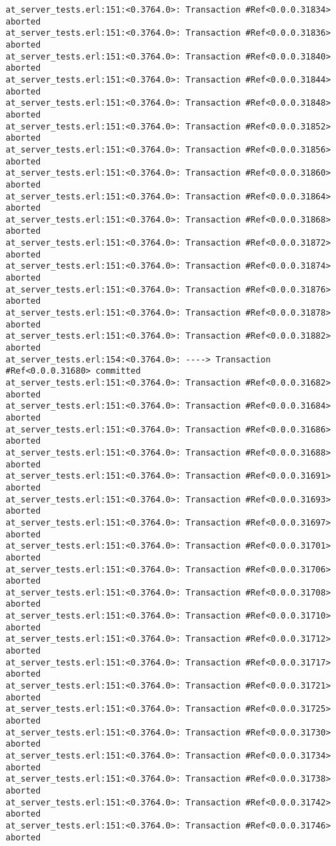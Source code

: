 \documentclass[
paper=a4,
oneside,
fontsize=11pt,
numbers=noenddot,
headinclude=false, %
footinclude=false, %
fleqn,             %
DIV=8
]{scrartcl}
\begin{document}
\begin{lstlisting}[caption=Session output: {\tt
    commit\_t\_competing\_test()} (debug enabled),
  label=lst:testoutcommit, basicstyle=\ttfamily\scriptsize]
at_server_tests.erl:151:<0.3764.0>: Transaction #Ref<0.0.0.31834> aborted
at_server_tests.erl:151:<0.3764.0>: Transaction #Ref<0.0.0.31836> aborted
at_server_tests.erl:151:<0.3764.0>: Transaction #Ref<0.0.0.31840> aborted
at_server_tests.erl:151:<0.3764.0>: Transaction #Ref<0.0.0.31844> aborted
at_server_tests.erl:151:<0.3764.0>: Transaction #Ref<0.0.0.31848> aborted
at_server_tests.erl:151:<0.3764.0>: Transaction #Ref<0.0.0.31852> aborted
at_server_tests.erl:151:<0.3764.0>: Transaction #Ref<0.0.0.31856> aborted
at_server_tests.erl:151:<0.3764.0>: Transaction #Ref<0.0.0.31860> aborted
at_server_tests.erl:151:<0.3764.0>: Transaction #Ref<0.0.0.31864> aborted
at_server_tests.erl:151:<0.3764.0>: Transaction #Ref<0.0.0.31868> aborted
at_server_tests.erl:151:<0.3764.0>: Transaction #Ref<0.0.0.31872> aborted
at_server_tests.erl:151:<0.3764.0>: Transaction #Ref<0.0.0.31874> aborted
at_server_tests.erl:151:<0.3764.0>: Transaction #Ref<0.0.0.31876> aborted
at_server_tests.erl:151:<0.3764.0>: Transaction #Ref<0.0.0.31878> aborted
at_server_tests.erl:151:<0.3764.0>: Transaction #Ref<0.0.0.31882> aborted
at_server_tests.erl:154:<0.3764.0>: ----> Transaction #Ref<0.0.0.31680> committed
at_server_tests.erl:151:<0.3764.0>: Transaction #Ref<0.0.0.31682> aborted
at_server_tests.erl:151:<0.3764.0>: Transaction #Ref<0.0.0.31684> aborted
at_server_tests.erl:151:<0.3764.0>: Transaction #Ref<0.0.0.31686> aborted
at_server_tests.erl:151:<0.3764.0>: Transaction #Ref<0.0.0.31688> aborted
at_server_tests.erl:151:<0.3764.0>: Transaction #Ref<0.0.0.31691> aborted
at_server_tests.erl:151:<0.3764.0>: Transaction #Ref<0.0.0.31693> aborted
at_server_tests.erl:151:<0.3764.0>: Transaction #Ref<0.0.0.31697> aborted
at_server_tests.erl:151:<0.3764.0>: Transaction #Ref<0.0.0.31701> aborted
at_server_tests.erl:151:<0.3764.0>: Transaction #Ref<0.0.0.31706> aborted
at_server_tests.erl:151:<0.3764.0>: Transaction #Ref<0.0.0.31708> aborted
at_server_tests.erl:151:<0.3764.0>: Transaction #Ref<0.0.0.31710> aborted
at_server_tests.erl:151:<0.3764.0>: Transaction #Ref<0.0.0.31712> aborted
at_server_tests.erl:151:<0.3764.0>: Transaction #Ref<0.0.0.31717> aborted
at_server_tests.erl:151:<0.3764.0>: Transaction #Ref<0.0.0.31721> aborted
at_server_tests.erl:151:<0.3764.0>: Transaction #Ref<0.0.0.31725> aborted
at_server_tests.erl:151:<0.3764.0>: Transaction #Ref<0.0.0.31730> aborted
at_server_tests.erl:151:<0.3764.0>: Transaction #Ref<0.0.0.31734> aborted
at_server_tests.erl:151:<0.3764.0>: Transaction #Ref<0.0.0.31738> aborted
at_server_tests.erl:151:<0.3764.0>: Transaction #Ref<0.0.0.31742> aborted
at_server_tests.erl:151:<0.3764.0>: Transaction #Ref<0.0.0.31746> aborted

\end{lstlisting}
\end{document}
